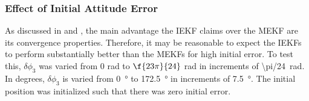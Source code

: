 \FloatBarrier

\subsubsection{Effect of Initial Attitude Error}

As discussed in \cite{Barrau2017} and \cite{Barrau2018}, the main advantage the IEKF claims over the MEKF are its convergence properties. Therefore, it may be reasonable to expect the IEKFs to perform substantially better than the MEKFs for high initial error. To test this, $\delta \phi_3$ was varied from 0 \si{\radian} to $\f{23\pi}{24}$ \si{\radian} in increments of \SI{\pi/24}{\radian}. In degrees, $\delta \phi_3$ is varied from  \SI{0}{\degree} to \SI{172.5}{\degree} in increments of \SI{7.5}{\degree}. The initial position was initialized such that there was zero initial error. 

